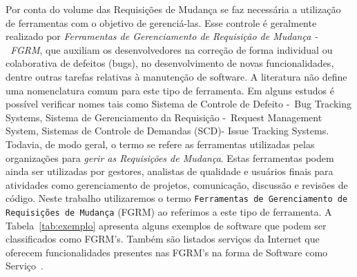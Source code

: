 Por conta do volume das Requisições de Mudança se faz necessária a utilização de
ferramentas com o objetivo de gerenciá-las. Esse controle é geralmente realizado
por \textit{Ferramentas de Gerenciamento de Requisição de Mudança -~FGRM}, que
auxiliam os desenvolvedores na correção de forma individual ou colaborativa de
defeitos (bugs), no desenvolvimento de novas funcionalidades, dentre outras
tarefas relativas à manutenção de software.  A literatura não define uma
nomenclatura comum para este tipo de ferramenta. Em alguns estudos é possível
verificar nomes tais como Sistema de Controle de Defeito -~Bug Tracking Systems,
Sistema de Gerenciamento da Requisição -~Request Management System, Sistemas de
Controle de Demandas (SCD)- Issue Tracking Systems. Todavia, de modo geral, o
termo se refere as ferramentas utilizadas pelas organizações para \textit{gerir
	as Requisições de Mudança}. Estas ferramentas podem ainda ser utilizadas por
gestores, analistas de qualidade e usuários finais para atividades como
gerenciamento de projetos, comunicação, discussão e revisões de código. Neste
trabalho utilizaremos o termo \texttt{Ferramentas de Gerenciamento de
	Requisições de Mudança} (FGRM) ao referimos a este tipo de ferramenta.  A
Tabela~\ref{tab:exemplo} apresenta alguns exemplos de software que podem ser
classificados como FGRM's. Também são listados serviços da Internet que oferecem
funcionalidades presentes nas FGRM's na forma de Software como
Serviço~\cite{fox2013engineering}.

\begin{table}[ht]
	\centering
	\caption{Exemplos de ferramentas e serviços da Internet. Adaptado
		de~\cite{cavalcanti2014challenges}}\label{tab:exemplo}
\end{table}

